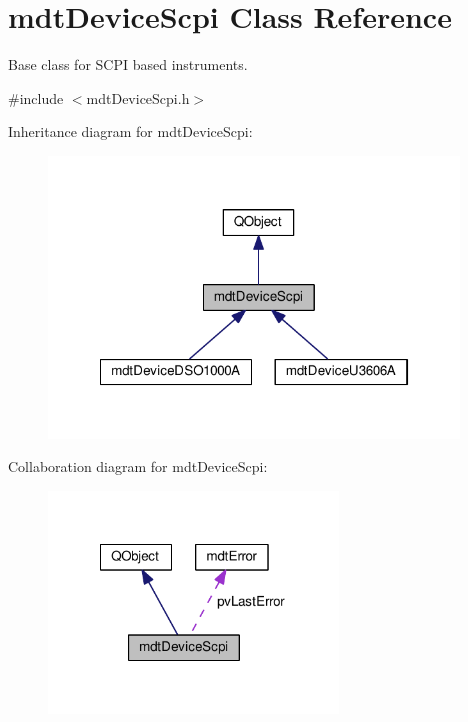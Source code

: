 \hypertarget{classmdt_device_scpi}{\section{mdt\-Device\-Scpi Class Reference}
\label{classmdt_device_scpi}
}


Base class for S\-C\-P\-I based instruments.  




{\ttfamily \#include $<$mdt\-Device\-Scpi.\-h$>$}



Inheritance diagram for mdt\-Device\-Scpi\-:\nopagebreak
\begin{figure}[H]
\begin{center}
\leavevmode
\includegraphics[width=309pt]{classmdt_device_scpi__inherit__graph}
\end{center}
\end{figure}


Collaboration diagram for mdt\-Device\-Scpi\-:\nopagebreak
\begin{figure}[H]
\begin{center}
\leavevmode
\includegraphics[width=218pt]{classmdt_device_scpi__coll__graph}
\end{center}
\end{figure}

